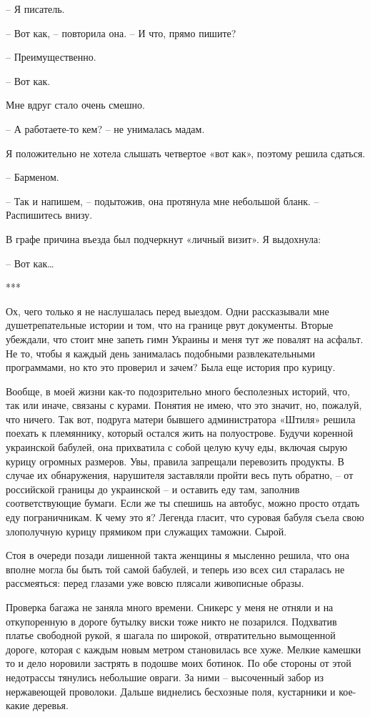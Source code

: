 \documentclass[
]{book}
\begin{document}
-- Я писатель.

-- Вот как, -- повторила она. -- И что, прямо пишите?

-- Преимущественно.

-- Вот как.

Мне вдруг стало очень смешно.

-- А работаете-то кем? -- не унималась мадам.

Я положительно не хотела слышать четвертое «вот как», поэтому решила сдаться.

-- Барменом.

-- Так и напишем, -- подытожив, она протянула мне небольшой бланк. -- Распишитесь внизу.

В графе причина въезда был подчеркнут «личный визит». Я выдохнула:

-- Вот как\ldots{}

***

Ох, чего только я не наслушалась перед выездом. Одни рассказывали мне душетрепательные истории и том, что на границе рвут документы. Вторые убеждали, что стоит мне запеть гимн Украины и меня тут же повалят на асфальт. Не то, чтобы я каждый день занималась подобными развлекательными программами, но кто это проверил и зачем? Была еще история про курицу.

Вообще, в моей жизни как-то подозрительно много бесполезных историй, что, так или иначе, связаны с курами. Понятия не имею, что это значит, но, пожалуй, что ничего. Так вот, подруга матери бывшего администратора «Штиля» решила поехать к племяннику, который остался жить на полуострове. Будучи коренной украинской бабулей, она прихватила с собой целую кучу еды, включая сырую курицу огромных размеров. Увы, правила запрещали перевозить продукты. В случае их обнаружения, нарушителя заставляли пройти весь путь обратно, -- от российской границы до украинской -- и оставить еду там, заполнив соответствующие бумаги. Если же ты спешишь на автобус, можно просто отдать еду пограничникам. К чему это я? Легенда гласит, что суровая бабуля съела свою злополучную курицу прямиком при служащих таможни. Сырой.

Стоя в очереди позади лишенной такта женщины я мысленно решила, что она вполне могла бы быть той самой бабулей, и теперь изо всех сил старалась не рассмеяться: перед глазами уже вовсю плясали живописные образы.

Проверка багажа не заняла много времени. Сникерс у меня не отняли и на откупоренную в дороге бутылку виски тоже никто не позарился. Подхватив платье свободной рукой, я шагала по широкой, отвратительно вымощенной дороге, которая с каждым новым метром становилась все хуже. Мелкие камешки то и дело норовили застрять в подошве моих ботинок. По обе стороны от этой недотрассы тянулись небольшие овраги. За ними -- высоченный забор из нержавеющей проволоки. Дальше виднелись бесхозные поля, кустарники и кое-какие деревья.
\end{document}
